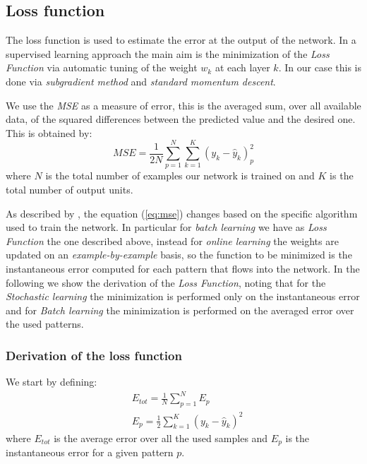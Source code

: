 \subsection{Loss function}
\label{Loss:Mse}
The loss function is used to estimate the error at the output of the network. In a supervised learning approach the main aim is the minimization of the \textit{Loss Function} via automatic tuning of the weight $w_k$ at each layer $k$. In our case this is done via \textit{subgradient method} and \textit{standard momentum descent}.

We use the \textit{MSE} as a measure of error, this is the averaged sum, over all available data, of the squared differences between the predicted value and the desired one.\newline
This is obtained by: 	
\begin{equation}
\label{eq:mse}
MSE = \frac{1}{2N} \sum_{p=1}^N \sum_{k=1}^K(y_k - \widehat{y}_k)_{p}^2
\end{equation}
where $N$ is the total number of examples our network is trained on and $K$ is the total number of output units.

As described by \parencite[Chap. 4.3]{haykin_neural_2009}, the equation (\ref{eq:mse}) changes based on the specific algorithm used to train the network. In particular for \textit{batch learning} we have as \textit{Loss Function} the one described above, instead for \textit{online learning} the weights are updated on an \textit{example-by-example} basis, so the function to be minimized is the instantaneous error computed for each pattern that flows into the network. In the following we show the derivation of the \textit{Loss Function}, noting that for the \textit{Stochastic learning} the minimization is performed only on the instantaneous error and for \textit{Batch learning} the minimization is performed on the averaged error over the used patterns.

\subsubsection{Derivation of the loss function}
We start by defining:
\begin{align*}
    & E_{tot} = \frac{1}{N} \sum_{p=1}^N E_p\\
    & E_p = \frac{1}{2} \sum_{k=1}^K(y_k - \widehat{y}_k)^2
\end{align*}
where $E_{tot}$ is the average error over all the used samples and $E_p$ is the instantaneous error for a given pattern $p$.

